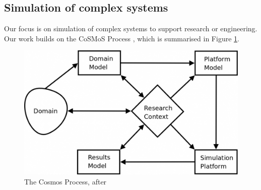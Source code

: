 \documentclass[sigconf,authordraft]{acmart}
\begin{document}
\subsection{Simulation of complex systems}

Our focus is on simulation of complex systems to support research or engineering.  Our work builds on the CoSMoS Process \cite{cosmosBook}, which is summarised in Figure \ref{fig:cosmos}.

\begin{figure}[ht]
  \centering
  \includegraphics[width=\columnwidth]{cosmosProcess.png}
  \caption{The Cosmos Process, after \cite{cosmosBook}}\label{fig:cosmos}
\end{figure}
\end{document}
